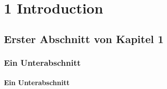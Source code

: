 \chapter{1	Introduction }

\section{Erster Abschnitt von Kapitel 1}
\subsection{Ein Unterabschnitt}
\subsubsection{Ein Unterabschnitt}
